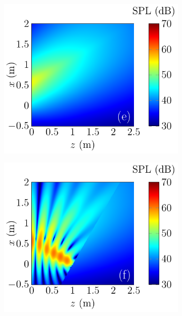 \begin{figure}[!htb]
\begin{subfigure}{0.32\textwidth}
    \end{subfigure}
    \begin{subfigure}{0.32\textwidth}
        \centering
        \includegraphics[width = \textwidth]{fig/ComputePalReflectionTruncated_Ultra200000_LocSurface1m_Absorp0_Image_211013Ad.pdf}
    \end{subfigure}
    \begin{subfigure}{0.32\textwidth}
        \centering
        \includegraphics[width = \textwidth]{fig/ComputePalReflectionTruncated_Ultra200000_LocSurface1m_Absorp0_Total_211013Ae.pdf}

\end{subfigure}
\end{figure}
